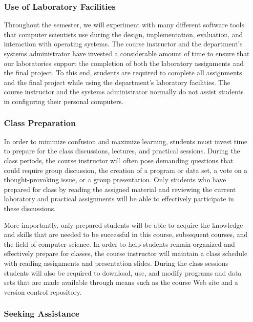 \subsubsection*{Use of Laboratory Facilities}

Throughout the semester, we will experiment with many different software tools that computer scientists use during the
design, implementation, evaluation, and interaction with operating systems.  The course instructor and the
department's systems administrator have invested a considerable amount of time to ensure that our laboratories support
the completion of both the laboratory assignments and the final project.  To this end, students are required to complete
all assignments and the final project while using the department's laboratory facilities. The course instructor and the
systems administrator normally do not assist students in configuring their personal computers.

\subsubsection*{Class Preparation}

In order to minimize confusion and maximize learning, students must invest time to prepare for the class discussions,
lectures, and practical sessions.  During the class periods, the course instructor will often pose demanding questions
that could require group discussion, the creation of a program or data set, a vote on a thought-provoking issue, or a
group presentation.  Only students who have prepared for class by reading the assigned material and reviewing the
current laboratory and practical assignments will be able to effectively participate in these discussions.

More importantly, only prepared students will be able to acquire the knowledge and skills that are needed to be
successful in this course, subsequent courses, and the field of computer science.  In order to help students remain
organized and effectively prepare for classes, the course instructor will maintain a class schedule with reading
assignments and presentation slides.   During the class sessions students will also be required to download, use, and
modify programs and data sets that are made available through means such as the course Web site and a version control
repository.

\subsubsection*{Seeking Assistance}

